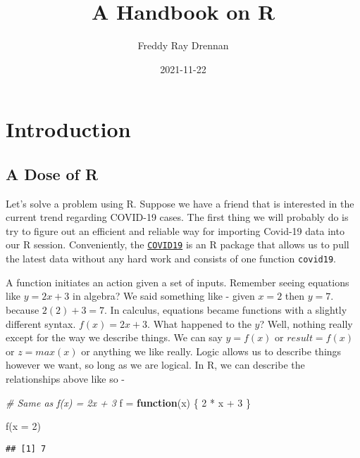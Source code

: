 \documentclass[
]{book}
\title{A Handbook on R}
\author{Freddy Ray Drennan}
\date{2021-11-22}
\newenvironment{Shaded}{\begin{snugshade}}{\end{snugshade}}
\newcommand{\AttributeTok}[1]{\textcolor[rgb]{0.77,0.63,0.00}{#1}}
\newcommand{\CommentTok}[1]{\textcolor[rgb]{0.56,0.35,0.01}{\textit{#1}}}
\newcommand{\ControlFlowTok}[1]{\textcolor[rgb]{0.13,0.29,0.53}{\textbf{#1}}}
\newcommand{\DecValTok}[1]{\textcolor[rgb]{0.00,0.00,0.81}{#1}}
\newcommand{\FunctionTok}[1]{\textcolor[rgb]{0.00,0.00,0.00}{#1}}
\newcommand{\NormalTok}[1]{#1}
\newcommand{\OtherTok}[1]{\textcolor[rgb]{0.56,0.35,0.01}{#1}}
\newcommand{\SpecialCharTok}[1]{\textcolor[rgb]{0.00,0.00,0.00}{#1}}
\begin{document}
\maketitle

{
\setcounter{tocdepth}{1}
\tableofcontents
}
\hypertarget{introduction}{%
\chapter{Introduction}\label{introduction}}

\hypertarget{a-dose-of-r}{%
\section{A Dose of R}\label{a-dose-of-r}}

Let's solve a problem using R. Suppose we have a friend that is interested in the current trend regarding COVID-19 cases. The first thing we will probably do is try to figure out an efficient and reliable way for importing Covid-19 data into our R session. Conveniently, the \href{https://covid19datahub.io/articles/r.html}{\texttt{COVID19}} is an R package that allows us to pull the latest data without any hard work and consists of one function \texttt{covid19}.

A function initiates an action given a set of inputs. Remember seeing equations like \(y = 2x + 3\) in algebra? We said something like - given \(x=2\) then \(y=7\). because \(2(2) + 3 = 7\). In calculus, equations became functions with a slightly different syntax. \(f(x) = 2x + 3\). What happened to the \(y\)? Well, nothing really except for the way we describe things. We can say \(y=f(x)\) or \(result=f(x)\) or \(z=max(x)\) or anything we like really. Logic allows us to describe things however we want, so long as we are logical. In R, we can describe the relationships above like so -

\begin{Shaded}
\begin{Highlighting}[]
\CommentTok{\# Same as f(x) = 2x + 3}
\NormalTok{f }\OtherTok{=} \ControlFlowTok{function}\NormalTok{(x) \{}
    \DecValTok{2} \SpecialCharTok{*}\NormalTok{ x }\SpecialCharTok{+} \DecValTok{3}
\NormalTok{\}}

\FunctionTok{f}\NormalTok{(}\AttributeTok{x =} \DecValTok{2}\NormalTok{)}
\end{Highlighting}
\end{Shaded}

\begin{verbatim}
## [1] 7
\end{verbatim}
\end{document}
